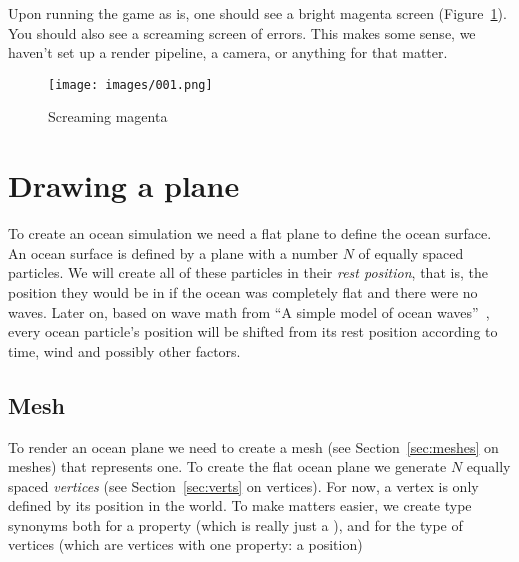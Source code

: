 Upon running the game as is, one should see a bright magenta screen (Figure~\ref{fig:001}). You should
also see a screaming screen of errors. This makes some sense,
we haven't set up a render pipeline, a camera, or anything for that matter.

\begin{figure}[h]
\centering
\texttt{[image: images/001.png]}
\caption{Screaming magenta\label{fig:001}}
\end{figure}


\section{Drawing a plane}

To create an ocean simulation we need a flat plane to define the ocean surface.
An ocean surface is defined by a plane with a number $N$ of equally spaced
particles. We will create all of these particles in their \emph{rest position},
that is, the position they would be in if the ocean was completely flat and
there were no waves. Later on, based on wave math from ``A simple model of
ocean waves''~\cite{10.1145/15886.15894}, every ocean particle's position will
be shifted from its rest position according to time, wind and possibly other
factors.

\subsection{Mesh}

To render an ocean plane we need to create a mesh (see Section~\ref{sec:meshes}
on meshes) that represents one. To create the flat ocean plane we generate $N$
equally spaced \emph{vertices} (see Section~\ref{sec:verts} on vertices). For
now, a vertex is only defined by its position in the world. To make matters
easier, we create type synonyms both for a  property (which is really
just a ), and for the type of  vertices (which are vertices
with one property: a position)

\begin{hscode}\SaveRestoreHook
{}%
%
\>[B]{}\;\mathrel{=}\<[E]%
\\
\>[B]{}\;\mathrel{=}\<[E]%
\ColumnHook
\end{hscode}\resethooks

